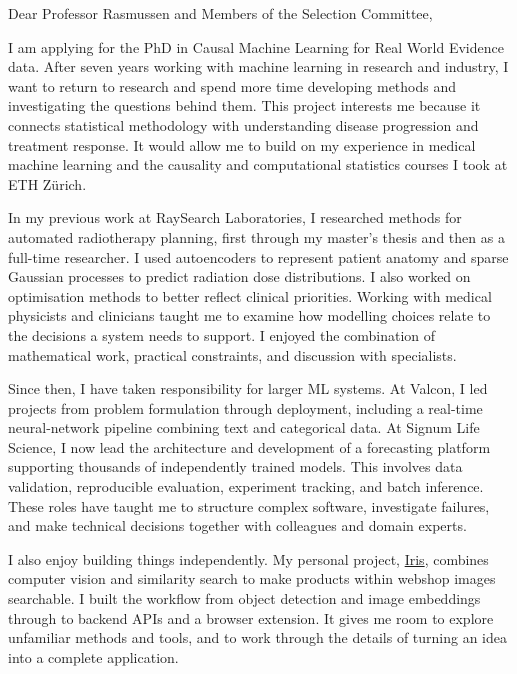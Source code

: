 \documentclass[11pt,a4paper]{moderncv}
\begin{document}
\makecvtitle
Dear Professor Rasmussen and Members of the Selection Committee,

\vspace*{2em}
I am applying for the PhD in Causal Machine Learning for Real World Evidence data. After seven years working with machine learning in research and industry, I want to return to research and spend more time developing methods and investigating the questions behind them. This project interests me because it connects statistical methodology with understanding disease progression and treatment response. It would allow me to build on my experience in medical machine learning and the causality and computational statistics courses I took at ETH Zürich.

\vspace{4pt}
\hspace*{2em}
In my previous work at RaySearch Laboratories, I researched methods for automated radiotherapy planning, first through my master's thesis and then as a full-time researcher. I used autoencoders to represent patient anatomy and sparse Gaussian processes to predict radiation dose distributions. I also worked on optimisation methods to better reflect clinical priorities. Working with medical physicists and clinicians taught me to examine how modelling choices relate to the decisions a system needs to support. I enjoyed the combination of mathematical work, practical constraints, and discussion with specialists.

\vspace{4pt}
\hspace*{2em}
Since then, I have taken responsibility for larger ML systems. At Valcon, I led projects from problem formulation through deployment, including a real-time neural-network pipeline combining text and categorical data. At Signum Life Science, I now lead the architecture and development of a forecasting platform supporting thousands of independently trained models. This involves data validation, reproducible evaluation, experiment tracking, and batch inference. These roles have taught me to structure complex software, investigate failures, and make technical decisions together with colleagues and domain experts.

\vspace{4pt}
\hspace*{2em}
I also enjoy building things independently. My personal project, \href{https://github.com/ivar-cashin-eriksson/iris}{Iris}, combines computer vision and similarity search to make products within webshop images searchable. I built the workflow from object detection and image embeddings through to backend APIs and a browser extension. It gives me room to explore unfamiliar methods and tools, and to work through the details of turning an idea into a complete application.
\end{document}
